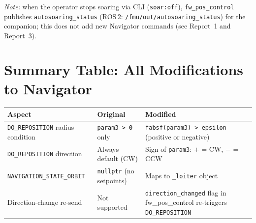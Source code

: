 \documentclass[12pt,a4paper]{article}
\begin{document}
\noindent\textit{Note:} when the operator stops soaring via CLI (\texttt{soar:off}),
\texttt{fw\_pos\_control} publishes \texttt{autosoaring\_status} (ROS\,2:
\texttt{/fmu/out/autosoaring\_status}) for the companion; this does not add new
Navigator commands (see Report~1 and Report~3).

\section{Summary Table: All Modifications to Navigator}

\begin{center}\begin{tabular}{p{3.5cm}p{4.5cm}p{5cm}}\toprule
Aspect & Original & Modified \\\midrule
\texttt{DO\_REPOSITION} radius condition & \texttt{param3 > 0} only & \texttt{fabsf(param3) > epsilon} (positive or negative) \\
\texttt{DO\_REPOSITION} direction & Always default (CW) & Sign of \texttt{param3}: $+$ = CW, $-$ = CCW \\
\texttt{NAVIGATION\_STATE\_ORBIT} & \texttt{nullptr} (no setpoints) & Maps to \texttt{\_loiter} object \\
Direction-change re-send & Not supported & \texttt{direction\_changed} flag in fw\_pos\_control re-triggers \texttt{DO\_REPOSITION} \\
\bottomrule\end{tabular}\end{center}
\end{document}
